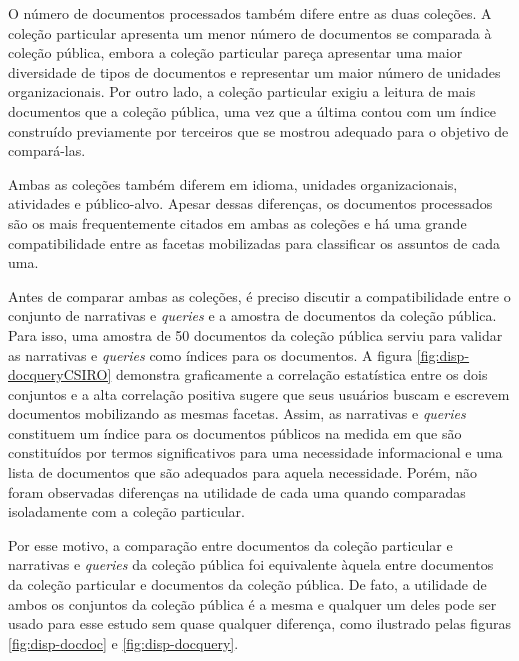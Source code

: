 O número de documentos processados também difere entre as duas coleções. A coleção particular apresenta um menor número de documentos se comparada à coleção pública, embora a coleção particular pareça apresentar uma maior diversidade de tipos de documentos e representar um maior número de unidades organizacionais. Por outro lado, a coleção particular exigiu a leitura de mais documentos que a coleção pública, uma vez que a última contou com um índice construído previamente por terceiros que se mostrou adequado para o objetivo de compará-las. 

Ambas as coleções também diferem em idioma, unidades organizacionais, atividades e público-alvo. Apesar dessas diferenças, os documentos processados são os mais frequentemente citados em ambas as coleções e há uma grande compatibilidade entre as facetas mobilizadas para classificar os assuntos de cada uma.

Antes de comparar ambas as coleções, é preciso discutir a compatibilidade entre o conjunto de narrativas e \textit{queries} e a amostra de documentos da coleção pública. Para isso, uma amostra de 50 documentos da coleção pública serviu para validar as narrativas e \textit{queries} como índices para os documentos. A figura \ref{fig:disp-docqueryCSIRO} demonstra graficamente a correlação estatística entre os dois conjuntos e a alta correlação positiva sugere que seus usuários buscam e escrevem documentos mobilizando as mesmas facetas. Assim, as narrativas e \textit{queries} constituem um índice para os documentos públicos na medida em que são constituídos por termos significativos para uma necessidade informacional e uma lista de documentos que são adequados para aquela necessidade. Porém, não foram observadas diferenças na utilidade de cada uma quando comparadas isoladamente com a coleção particular.

Por esse motivo, a comparação entre documentos da coleção particular e narrativas e \textit{queries} da coleção pública foi equivalente àquela entre documentos da coleção particular e documentos da coleção pública. De fato, a utilidade de ambos os conjuntos da coleção pública é a mesma e qualquer um deles pode ser usado para esse estudo sem quase qualquer diferença, como ilustrado pelas figuras \ref{fig:disp-docdoc} e \ref{fig:disp-docquery}.

